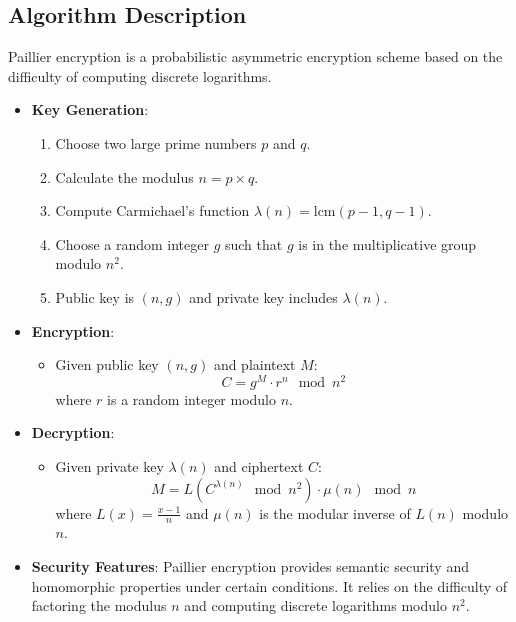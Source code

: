 \documentclass{article}
\begin{document}
\subsection{Algorithm Description}
Paillier encryption is a probabilistic asymmetric encryption scheme based on the difficulty of computing discrete logarithms.
\begin{itemize}
    \item \textbf{Key Generation}:
    \begin{enumerate}
        \item Choose two large prime numbers \( p \) and \( q \).
        \item Calculate the modulus \( n = p \times q \).
        \item Compute Carmichael's function \( \lambda(n) = \text{lcm}(p-1, q-1) \).
        \item Choose a random integer \( g \) such that \( g \) is in the multiplicative group modulo \( n^2 \).
        \item Public key is \( (n, g) \) and private key includes \( \lambda(n) \).
    \end{enumerate}
    
    \item \textbf{Encryption}:
    \begin{itemize}
        \item Given public key \( (n, g) \) and plaintext \( M \):
        \[
        C = g^M \cdot r^n \mod n^2
        \]
        where \( r \) is a random integer modulo \( n \).
    \end{itemize}
    
    \item \textbf{Decryption}:
    \begin{itemize}
        \item Given private key \( \lambda(n) \) and ciphertext \( C \):
        \[
        M = L\left(C^{\lambda(n)} \mod n^2\right) \cdot \mu(n) \mod n
        \]
        where \( L(x) = \frac{x - 1}{n} \) and \( \mu(n) \) is the modular inverse of \( L(n) \) modulo \( n \).
    \end{itemize}
    
    \item \textbf{Security Features}:
    Paillier encryption provides semantic security and homomorphic properties under certain conditions. It relies on the difficulty of factoring the modulus \( n \) and computing discrete logarithms modulo \( n^2 \).
\end{itemize}
\end{document}
